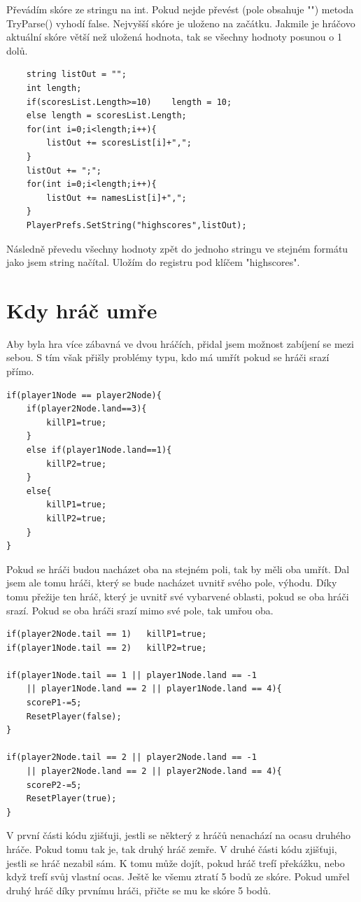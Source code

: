 \documentclass[12pt,a4paper]{report}
\begin{document}
Převádím skóre ze stringu na int. Pokud nejde převést (pole obsahuje "") metoda TryParse() vyhodí false.
Nejvyšší skóre je uloženo na začátku. Jakmile je hráčovo aktuální skóre větší než uložená hodnota, tak se všechny hodnoty posunou o 1 dolů.
\begin{lstlisting}
    string listOut = "";
    int length;
    if(scoresList.Length>=10)    length = 10;
    else length = scoresList.Length;
    for(int i=0;i<length;i++){ 
        listOut += scoresList[i]+",";
    }
    listOut += ";";        
    for(int i=0;i<length;i++){
        listOut += namesList[i]+",";
    }
    PlayerPrefs.SetString("highscores",listOut);
\end{lstlisting}
Následně převedu všechny hodnoty zpět do jednoho stringu ve stejném formátu jako jsem string načítal.
Uložím do registru pod klíčem "highscores".
\newpage
\section{Kdy hráč umře}
Aby byla hra více zábavná ve dvou hráčích, přidal jsem možnost zabíjení se mezi sebou.
S tím však přišly problémy typu, kdo má umřít pokud se hráči srazí přímo.
\begin{lstlisting}
if(player1Node == player2Node){
    if(player2Node.land==3){
        killP1=true;
    }
    else if(player1Node.land==1){
        killP2=true;
    }
    else{
        killP1=true;
        killP2=true;
    }
}
\end{lstlisting}
Pokud se hráči budou nacházet oba na stejném poli, tak by měli oba umřít.
Dal jsem ale tomu hráči, který se bude nacházet uvnitř svého pole, výhodu.
Díky tomu přežije ten hráč, který je uvnitř své vybarvené oblasti, pokud se oba hráči srazí.
Pokud se oba hráči srazí mimo své pole, tak umřou oba.
\begin{lstlisting}
if(player2Node.tail == 1)   killP1=true;
if(player1Node.tail == 2)   killP2=true;

if(player1Node.tail == 1 || player1Node.land == -1 
    || player1Node.land == 2 || player1Node.land == 4){
    scoreP1-=5;
    ResetPlayer(false);
}

if(player2Node.tail == 2 || player2Node.land == -1 
    || player2Node.land == 2 || player2Node.land == 4){
    scoreP2-=5;
    ResetPlayer(true);
}   
\end{lstlisting}
V první části kódu zjišťuji, jestli se některý z hráčů nenachází na ocasu druhého hráče.
Pokud tomu tak je, tak druhý hráč zemře.
V druhé části kódu zjišťuji, jestli se hráč nezabil sám.
K tomu může dojít, pokud hráč trefí překážku, nebo když trefí svůj vlastní ocas.
Ještě ke všemu ztratí 5 bodů ze skóre.
Pokud umřel druhý hráč díky prvnímu hráči, přičte se mu ke skóre 5 bodů.
\newpage
\end{document}
